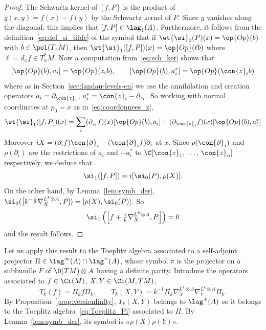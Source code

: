 \begin{proof}
The Schwartz kernel of $[f, P]$ is the product of $g(x,y)= f(x) -
f(y)$ by the Schwartz kernel of $P$. Since $g$ vanishes along the diagonal, this implies that $[f, P] \in \lag_1 (A)$. Furthermore, it follows from the definition~\eqref{eq:def_si_tilde} of the symbol that if $\wt{\si}_0 (P)(x) = \op{Op} (b)$ with $b \in \pol (T_xM)$, then $\wt{\si}_1 ([f, P])(x) = \op{Op} (\ell b)$ where $\ell = d_x f \in T_x^*M$. Now a computation from~\eqref{eq:sch_ker} shows that
\[
\left[\op{Op} (b), a_i\right] = \op{Op} (z_i b), \qquad \left[\op{Op} (b), a_i^*\right] = \op{Op} (\con{z}_i b)
\]
where as in Section~\ref{sec:landau-levels-cn} we use the annihilation and creation operators $a_i = \partial_{\con{z}_i}$, $a_i^* = \con{z}_i -
\partial_{z_i}$.  So working with normal coordinates at $p_0 =x$ as in~\eqref{eq:coordonnees_z},
\[
\wt{\si}_1 ([f, P])(x) = \sum_i (\partial_{z_i} f)(x) [\op{Op} (b), a_i] + (\partial_{\con{z}_i} f)(x) [\op{Op} (b), a_i^*]
\]
Moreover $ i X = (\partial_i f) \con{\partial}_i - (\con{\partial}_if)
\partial_i $ at $x$. Since $ \rho (\con{\partial}_i)$ and $\rho (\partial_i)$ are the restrictions of $a_i$ and $-a_i^*$ to $\C[\con{z}_1,\,
\ldots,\,\con{z}_n]$ respectively, we deduce that
\[
\si_1 ([f, P]) = i [\si_0 (P), \rho(X)].
\]
On the other hand, by Lemma~\ref{lem:symb_der}, $\si_0 (\bigl[k^{-\frac{1}{2}}
\nabla_X^{L^k \otimes A}, P]) = [\rho(X), \si_0 (P)]$. So
\[
\si_1 \left(\left[f + \tfrac{i}{k} \nabla_X^{L^k \otimes A}, P\right]\right) =0
\]
and the result follows. 
\end{proof}

Let us apply this result to the Toeplitz algebra associated to a self-adjoint projector $\Pi \in \lag^{\infty}(A) \cap \lag^{+}(A)$, whose symbol $\pi$ is the projector on a subbundle $F$ of $\D (TM) \otimes A$ having a definite parity. Introduce the operators associated to $f \in \Ci (M)$, $X, Y \in
\Ci (M, TM)$,
\[
T_k (f) = \Pi_k f \Pi_k, \qquad T_k (X, Y) = k^{-1} \Pi_k \nabla^{L^k
\otimes A}_X \nabla^{L^k
\otimes A}_Y \Pi_k.
\]
By Proposition~\ref{prop:versionlinfty}, $T_k (X, Y)$ belongs to $\lag ^+(A)$ so it belongs to the Toeplitz algebra~\eqref{eq:Toeplitz_Pi} associated to $\Pi$. By Lemma~\ref{lem:symb_der}, its symbol is $\pi \rho (X) \rho (Y)
\pi$.

